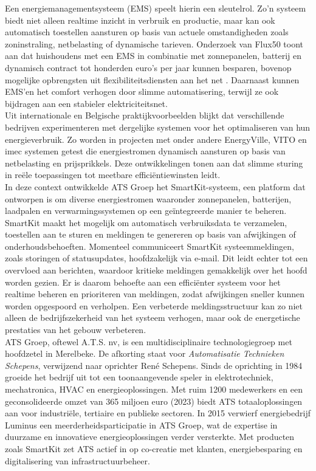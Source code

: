 Een energiemanagementsysteem (EMS) speelt hierin een sleutelrol. Zo’n systeem biedt niet alleen realtime inzicht in verbruik en productie, maar kan ook automatisch toestellen aansturen op basis van actuele omstandigheden zoals zoninstraling, netbelasting of dynamische tarieven. Onderzoek van Flux50 toont aan dat huishoudens met een EMS in combinatie met zonnepanelen, batterij en dynamisch contract tot honderden euro’s per jaar kunnen besparen, bovenop mogelijke opbrengsten uit flexibiliteitsdiensten aan het net \autocite{Selleslagh2024}. Daarnaast kunnen EMS'en het comfort verhogen door slimme automatisering, terwijl ze ook bijdragen aan een stabieler elektriciteitsnet.\\

Uit internationale en Belgische praktijkvoorbeelden blijkt dat verschillende bedrijven experimenteren met dergelijke systemen voor het optimaliseren van hun energieverbruik. Zo worden in projecten met onder andere EnergyVille, VITO en imec systemen getest die energiestromen dynamisch aansturen op basis van netbelasting en prijsprikkels. Deze ontwikkelingen tonen aan dat slimme sturing in reële toepassingen tot meetbare efficiëntiewinsten leidt.\\

In deze context ontwikkelde ATS Groep het SmartKit-systeem, een platform dat ontworpen is om diverse energiestromen waaronder zonnepanelen, batterijen, laadpalen en verwarmingssystemen op een geïntegreerde manier te beheren. SmartKit maakt het mogelijk om automatisch verbruiksdata te verzamelen, toestellen aan te sturen en meldingen te genereren op basis van afwijkingen of onderhoudsbehoeften. Momenteel communiceert SmartKit systeemmeldingen, zoals storingen of statusupdates, hoofdzakelijk via e-mail. Dit leidt echter tot een overvloed aan berichten, waardoor kritieke meldingen gemakkelijk over het hoofd worden gezien. Er is daarom behoefte aan een efficiënter systeem voor het realtime beheren en prioriteren van meldingen, zodat afwijkingen sneller kunnen worden opgespoord en verholpen. Een verbeterde meldingsstructuur kan zo niet alleen de bedrijfszekerheid van het systeem verhogen, maar ook de energetische prestaties van het gebouw verbeteren.\\

ATS Groep, oftewel A.T.S. nv, is een multidisciplinaire technologiegroep met hoofdzetel in Merelbeke. De afkorting staat voor \textit{Automatisatie Technieken Schepens}, verwijzend naar oprichter René Schepens. Sinds de oprichting in 1984 groeide het bedrijf uit tot een toonaangevende speler in elektrotechniek, mechatronica, HVAC en energieoplossingen. Met ruim 1200 medewerkers en een geconsolideerde omzet van 365 miljoen euro (2023) biedt ATS totaaloplossingen aan voor industriële, tertiaire en publieke sectoren. In 2015 verwierf energiebedrijf Luminus een meerderheidsparticipatie in ATS Groep, wat de expertise in duurzame en innovatieve energieoplossingen verder versterkte. Met producten zoals SmartKit zet ATS actief in op co-creatie met klanten, energiebesparing en digitalisering van infrastructuurbeheer.


